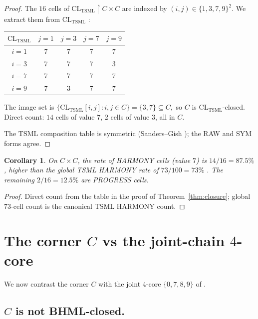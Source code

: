 \documentclass[11pt,reqno]{amsart}
\theoremstyle{plain}
\newtheorem{corollary}[theorem]{Corollary}
\theoremstyle{definition}
\theoremstyle{remark}
\newcommand{\TSML}{\mathrm{TSML}}
\begin{document}
\begin{proof}
The $16$ cells of $\mathrm{CL}_\TSML \restriction C \times C$ are
indexed by $(i, j) \in \{1, 3, 7, 9\}^2$.  We extract them from
$\mathrm{CL}_\TSML$ \cite[\S 2]{SandersForcing}:
\begin{center}
\begin{tabular}{c|cccc}
$\mathrm{CL}_\TSML$ & $j=1$ & $j=3$ & $j=7$ & $j=9$ \\
\hline
$i=1$ & 7 & 7 & 7 & 7 \\
$i=3$ & 7 & 7 & 7 & 3 \\
$i=7$ & 7 & 7 & 7 & 7 \\
$i=9$ & 7 & 3 & 7 & 7 \\
\end{tabular}
\end{center}
The image set is
\(
\{ \mathrm{CL}_\TSML[i, j] : i, j \in C \} = \{3, 7\} \subseteq C,
\)
so $C$ is $\mathrm{CL}_\TSML$-closed.  Direct count: $14$ cells of
value $7$, $2$ cells of value $3$, all in $C$.

The TSML composition table is symmetric (Sanders--Gish
\cite[Lemma 2.4]{SandersForcing}); the RAW and SYM forms agree.
\end{proof}

\begin{corollary}\label{cor:harm-sat}
On $C \times C$, the rate of HARMONY cells (value $7$) is
$14/16 = 87.5\%$, higher than the global TSML HARMONY rate of
$73/100 = 73\%$ \cite[D10]{SandersForcing}.  The remaining
$2/16 = 12.5\%$ are PROGRESS cells.
\end{corollary}

\begin{proof}
Direct count from the table in the proof of Theorem~\ref{thm:closure};
global $73$-cell count is the canonical TSML HARMONY count.
\end{proof}

\section{The corner $C$ vs the joint-chain $4$-core}
\label{sec:vs4core}

We now contrast the corner $C$ with the joint $4$-core
$\{0, 7, 8, 9\}$ of \cite{SandersGishFourCore}.

\subsection{$C$ is not BHML-closed.}
\end{document}
